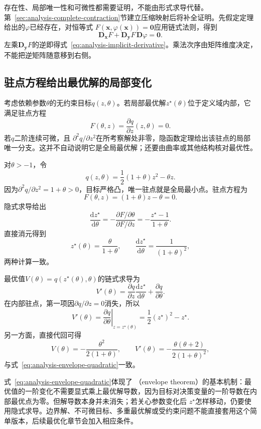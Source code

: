存在性、局部唯一性和可微性都需要证明，不能由形式求导代替。第~\ref{sec:analysis-complete-contraction}节建立压缩映射后将补全证明。先假定定理给出的$\varphi$已经存在，对恒等式 $F(\bm{x},\varphi(\bm{x}))=\bm{0}$应用链式法则，得到
\[   \bm{D}_{\bm{x}}F   +   \bm{D}_{\bm{y}}F\,\bm{D}\varphi   =   \bm{0}. \]
左乘$\bm{D}_{\bm{y}}F$的逆即得式~\eqref{eq:analysis-implicit-derivative}。乘法次序由矩阵维度决定，不能把逆矩阵随意移到右侧。
\subsection{驻点方程给出最优解的局部变化}

考虑依赖参数$\theta$的无约束目标$q(z,\theta)$。若局部最优解$z^\star(\theta)$位于定义域内部，它满足驻点方程
\[   F(\theta,z)   =   \frac{\partial q}{\partial z}(z,\theta)   =   0. \]
若$q$二阶连续可微，且 $\partial^2q/\partial z^2$在所考察解处非零，隐函数定理给出该驻点的局部唯一分支。这并不自动说明它是全局最优解；还要由曲率或其他结构核对最优性。
\begin{example}[参数二次目标中的解导数与包络导数]
\label{ex:analysis-parametric-quadratic}
对$\theta>-1$，令
\[   q(z,\theta)   =   \frac12(1+\theta)z^2-\theta z. \]
因为$\partial^2q/\partial z^2=1+\theta>0$，目标严格凸，唯一驻点就是全局最小点。驻点方程为
\[   F(\theta,z)=(1+\theta)z-\theta=0. \]
隐式求导给出
\[   \frac{\mathrm{d}z^\star}{\mathrm{d}\theta}   =   -\frac{\partial F/\partial\theta}{\partial F/\partial z}   =   -\frac{z^\star-1}{1+\theta}. \]
直接消元得到
\[   z^\star(\theta)=\frac{\theta}{1+\theta},   \qquad   \frac{\mathrm{d}z^\star}{\mathrm{d}\theta}   =   \frac{1}{(1+\theta)^2}, \]
两种计算一致。

最优值$V(\theta)=q(z^\star(\theta),\theta)$的链式求导为
\[   V'(\theta)   =   \frac{\partial q}{\partial z}   \frac{\mathrm{d}z^\star}{\mathrm{d}\theta}   +   \frac{\partial q}{\partial\theta}. \]
在内部驻点，第一项因$\partial q/\partial z=0$消失，所以
\begin{equation}
  V'(\theta)
  =
  \left.
  \frac{\partial q}{\partial\theta}
  \right|_{z=z^\star(\theta)}
  =
  \frac12(z^\star)^2-z^\star.
\label{eq:analysis-envelope-quadratic}
\end{equation}
另一方面，直接代回可得
\[   V(\theta)=-\frac{\theta^2}{2(1+\theta)},   \qquad   V'(\theta)   =   -\frac{\theta(\theta+2)}{2(1+\theta)^2}, \]
与式~\eqref{eq:analysis-envelope-quadratic}一致。
\end{example}

式~\eqref{eq:analysis-envelope-quadratic}体现了
（envelope theorem）的基本机制：最优值的一阶变化不需要显式乘上最优解导数，因为目标对决策变量的一阶导数在内部最优点为零。但解导数本身并未消失；若关心参数变化后 $z^\star$怎样移动，仍要使用隐式求导。边界解、不可微目标、多重最优解或受约束问题不能直接套用这个简单版本，后续最优化章节会加入相应条件。
